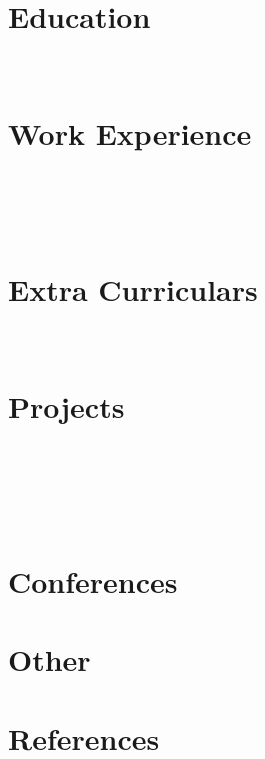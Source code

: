 \documentclass[a4paper,11pt]{article}
\begin{document}
\pagestyle{empty}



\section{Education}
 \\[-18pt]

\section{Work Experience}
 \\[5pt]
 \\[5pt]
 \\[5pt]

% 

\section{Extra Curriculars}
 \\[5pt]


\section{Projects}
 \\[5pt]
\newpage
 \\[5pt]
 \\[5pt]
 \\[5pt]

% 
% 
% 
% 

\section{Conferences}


% 

\section{Other}


\section{References}

\end{document}
